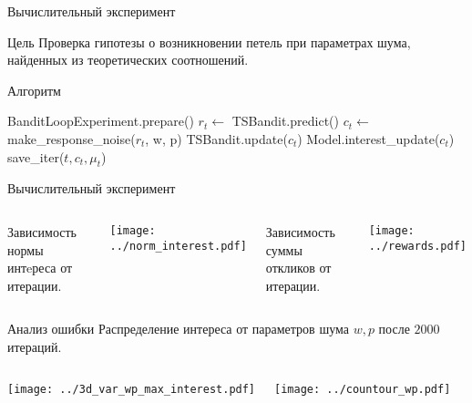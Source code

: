 \documentclass{beamer}
\begin{document}
\begin{frame}{Вычислительный эксперимент}
\begin{block}{Цель}
Проверка гипотезы о возникновении петель при параметрах шума, найденных из теоретических соотношений. 
\end{block}

\begin{block}{Алгоритм}
\begin{algorithmic}
  \STATE BanditLoopExperiment.prepare()
    \STATE $r_t \leftarrow$ TSBandit.predict()
    \STATE $c_t \leftarrow$ make\_response\_noise($r_t$, w, p)
    \STATE TSBandit.update($c_t$)
    \STATE Model.interest\_update($c_t$)
    \STATE save\_iter($t, c_t, \mu_t$)
  \ENDFOR
\end{algorithmic}
\end{block}

\end{frame}
\begin{frame}{Вычислительный эксперимент}
\begin{columns}[c]
Зависимость нормы интeреса от итерации.
\begin{center}
  \texttt{[image: ../norm\_interest.pdf]}
\end{center}
Зависимость суммы откликов от итерации.  
\begin{center}
  \texttt{[image: ../rewards.pdf]}
\end{center}
\end{columns}

\end{frame}
\begin{frame}{Анализ ошибки}
Распределение интереса от параметров шума $w, p$ после $2000$ итераций.
\begin{columns}[c]
\begin{center}
  \texttt{[image: ../3d\_var\_wp\_max\_interest.pdf]}
\end{center}
\begin{center}
  \texttt{[image: ../countour\_wp.pdf]}
\end{center}
\end{columns}
\end{frame}
\end{document}
